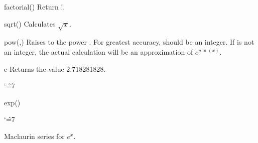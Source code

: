 \begin{math-function}{factorial()}
\mathcommand
    Return !.
\begin{codeexample}[]
 \pgfmathresult
\end{codeexample}
\end{math-function}

\begin{math-function}{sqrt()}
\mathcommand
    Calculates $\sqrt{x}$.
\begin{codeexample}[]
 \pgfmathresult
\end{codeexample}

\begin{codeexample}[]
 \pgfmathresult
\end{codeexample}
\end{math-function}

\begin{math-function}{pow(,)}
\mathcommand
    Raises  to the power . For greatest accuracy, 
    should be an integer. If  is not an integer, the actual calculation
    will be an approximation of $e^{y \ln(x)}$.
\begin{codeexample}[]
 \pgfmathresult
\end{codeexample}
\end{math-function}

\begin{math-function}{e}
\mathcommand
    Returns the value 2.718281828.
{
\catcode`\^=7
\begin{codeexample}[]
 \pgfmathresult
\end{codeexample}
}
\end{math-function}

\begin{math-function}{exp()}
\mathcommand
{ \catcode`\^=7

    Maclaurin series for $e^x$.
}
\begin{codeexample}[]
 \pgfmathresult
\end{codeexample}

\begin{codeexample}[]
 \pgfmathresult
\end{codeexample}
\end{math-function}

